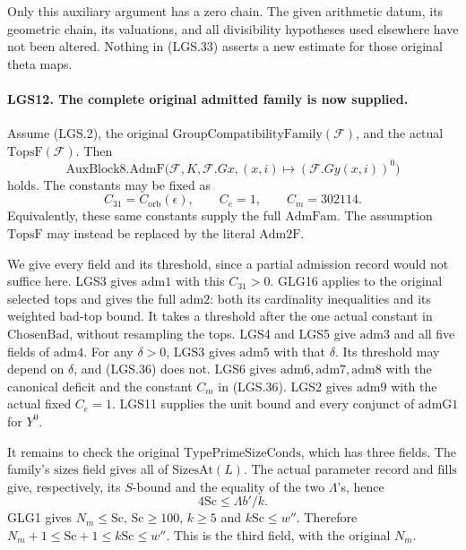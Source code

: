 \documentclass[11pt,a4paper]{article}
\numberwithin{equation}{section}
\theoremstyle{remark}\newtheorem{remark}[theorem]{Remark}
\begin{document}
Only this auxiliary argument has a zero chain.
The given arithmetic datum, its geometric chain,
its valuations, and all divisibility hypotheses used
elsewhere have not been altered.  Nothing in
(LGS.33) asserts a new estimate for those original
theta maps.

\paragraph{LGS12. The complete original admitted family is now supplied.}
\label{claim:LGS12}
Assume (LGS.2), the original
\(\mathrm{GroupCompatibilityFamily}(\mathcal F)\), and
the actual \(\mathrm{TopsF}(\mathcal F)\).
Then
\[
 \mathrm{AuxBlock8.AdmF}
   \bigl(\mathcal F,K,\mathcal F.Gx,
                     (x,i)\mapsto(\mathcal F.Gy(x,i))^0\bigr)      \tag{LGS.35}
\]
holds.  The constants may be fixed as
\[
       C_{31}=C_{\mathrm{orb}}(\epsilon),\qquad
                         C_e=1,\qquad C_m=302114.     \tag{LGS.36}
\]
Equivalently, these same constants supply the full
\(\mathrm{AdmFam}\).  The assumption \(\mathrm{TopsF}\)
may instead be replaced by the literal \(\mathrm{Adm2F}\).

We give every field and its threshold, since a partial
admission record would not suffice here.
LGS3 gives \(\mathrm{adm1}\) with this \(C_{31}>0\).
GLG16 applies to the original selected tops and gives
the full \(\mathrm{adm2}\): both its cardinality
inequalities and its weighted bad-top bound.
It takes a threshold after the one actual constant
in \(\mathrm{ChosenBad}\), without resampling the tops.
LGS4 and LGS5 give \(\mathrm{adm3}\) and all five
fields of \(\mathrm{adm4}\).
For any \(\delta>0\), LGS3 gives \(\mathrm{adm5}\)
with that \(\delta\).  Its threshold may depend on
\(\delta\), and (LGS.36) does not.
LGS6 gives \(\mathrm{adm6},\mathrm{adm7},\mathrm{adm8}\)
with the canonical deficit and the constant \(C_m\)
in (LGS.36).  LGS2 gives \(\mathrm{adm9}\) with
the actual fixed \(C_e=1\).
LGS11 supplies the unit bound and every conjunct of
\(\mathrm{admG1}\) for \(Y^0\).

It remains to check the original
\(\mathrm{TypePrimeSizeConds}\), which has three fields.
The family's \(\mathrm{sizes}\) field gives all of
\(\mathrm{SizesAt}(L)\).
The actual parameter record and \(\mathrm{fills}\)
give, respectively, its \(S\)-bound and the equality
of the two \(\Lambda\)'s, hence
\[
                  4\mathrm{Sc}\le\Lambda b'/k.
 \]
GLG1 gives \(N_m\le\mathrm{Sc}\),
\(\mathrm{Sc}\ge100\), \(k\ge5\) and
\(k\mathrm{Sc}\le w''\).  Therefore
\(N_m+1\le\mathrm{Sc}+1\le k\mathrm{Sc}\le w''\).
This is the third field, with the original \(N_m\).
\end{document}
